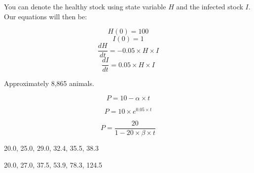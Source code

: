 \documentclass[]{memoir}
\begin{document}
You can denote the healthy stock using state variable $H$ and the
infected stock $I$. Our equations will then be:

\[ H(0) = 100 \] \[ I(0) = 1 \]
\[ \frac{dH}{dt} = -0.05 \times H \times I \]
\[ \frac{dI}{dt} = 0.05 \times H \times I \]


Approximately 8,865 animals.


\[ P = 10 - \alpha \times t\]


\[ P = 10 \times e^{0.05\times t}\]


\[ P = \frac{20}{1 - 20 \times \beta \times t }\]


20.0, 25.0, 29.0, 32.4, 35.5, 38.3


20.0, 27.0, 37.5, 53.9, 78.3, 124.5

\end{document}
